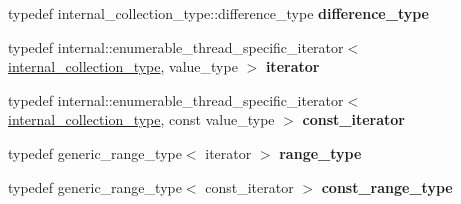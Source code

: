 \begin{DoxyCompactItemize}
\item 
\hypertarget{classtbb_1_1interface6_1_1enumerable__thread__specific_a0b6f002367fa7ca2e3e245e76d91ea7e}{}typedef internal\+\_\+collection\+\_\+type\+::difference\+\_\+type {\bfseries difference\+\_\+type}\label{classtbb_1_1interface6_1_1enumerable__thread__specific_a0b6f002367fa7ca2e3e245e76d91ea7e}

\item 
\hypertarget{classtbb_1_1interface6_1_1enumerable__thread__specific_a713e97c954eef04e3fda62cf8c8bd63f}{}typedef internal\+::enumerable\+\_\+thread\+\_\+specific\+\_\+iterator$<$ \hyperlink{classtbb_1_1concurrent__vector}{internal\+\_\+collection\+\_\+type}, value\+\_\+type $>$ {\bfseries iterator}\label{classtbb_1_1interface6_1_1enumerable__thread__specific_a713e97c954eef04e3fda62cf8c8bd63f}

\item 
\hypertarget{classtbb_1_1interface6_1_1enumerable__thread__specific_a9dacd1e38e45ee787faafd3a71b23fc2}{}typedef internal\+::enumerable\+\_\+thread\+\_\+specific\+\_\+iterator$<$ \hyperlink{classtbb_1_1concurrent__vector}{internal\+\_\+collection\+\_\+type}, const value\+\_\+type $>$ {\bfseries const\+\_\+iterator}\label{classtbb_1_1interface6_1_1enumerable__thread__specific_a9dacd1e38e45ee787faafd3a71b23fc2}

\item 
\hypertarget{classtbb_1_1interface6_1_1enumerable__thread__specific_a2200200e24eaf5ed6496ff3eaa6c4dcc}{}typedef generic\+\_\+range\+\_\+type$<$ iterator $>$ {\bfseries range\+\_\+type}\label{classtbb_1_1interface6_1_1enumerable__thread__specific_a2200200e24eaf5ed6496ff3eaa6c4dcc}

\item 
\hypertarget{classtbb_1_1interface6_1_1enumerable__thread__specific_a9877dc4e09dc6c625a86a463f56f180d}{}typedef generic\+\_\+range\+\_\+type$<$ const\+\_\+iterator $>$ {\bfseries const\+\_\+range\+\_\+type}\label{classtbb_1_1interface6_1_1enumerable__thread__specific_a9877dc4e09dc6c625a86a463f56f180d}

\end{DoxyCompactItemize}
